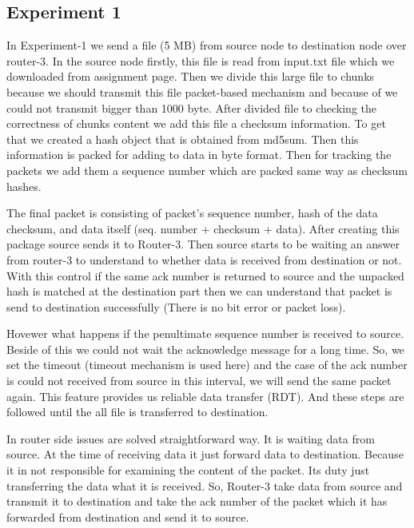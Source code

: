 \documentclass[letterpaper, 12 pt, conference]{ieeeconf}  %
\begin{document}
\subsection{Experiment 1}
In Experiment-1 we send a file (5 MB) from source node to destination node over router-3. In the source node firstly, this file is read from input.txt file which we downloaded from assignment page. Then we divide this large file to chunks because we should transmit this file packet-based mechanism and because of we could not transmit bigger than 1000 byte. After divided file to checking the correctness of chunks content we add this file a checksum information. To get that we created a hash object that is obtained from md5sum. Then this information is packed for adding to data in byte format. Then for tracking the packets we add them a sequence number which are packed same way as checksum hashes.
\vspace{1cm}

The final packet is consisting of packet’s sequence number, hash of the data checksum, and data itself (seq. number + checksum + data). After creating this package source sends it to Router-3. Then source starts to be waiting an answer from router-3 to understand to whether data is received from destination or not. With this control if the same ack number is returned to source and the unpacked hash is matched at the destination part then we can understand that packet is send to destination successfully (There is no bit error or packet loss). 
\vspace{1cm}

Hovewer what happens if the penultimate sequence number is received to source. Beside of this we could not wait the acknowledge message for a long time. So, we set the timeout (timeout mechanism is used here) and the case of the ack number is could not received from source in this interval, we will send the same packet again. This feature provides us reliable data transfer (RDT). And these steps are followed until the all file is transferred to destination. 

In router side issues are solved straightforward way. It is waiting data from source. At the time of receiving data it just forward data to destination. Because it in not responsible for examining the content of the packet. Its duty just transferring the data what it is received. So, Router-3 take data from source and transmit it to destination and take the ack number of the packet which it has forwarded from destination and send it to source.
\vspace{1cm}
\end{document}
